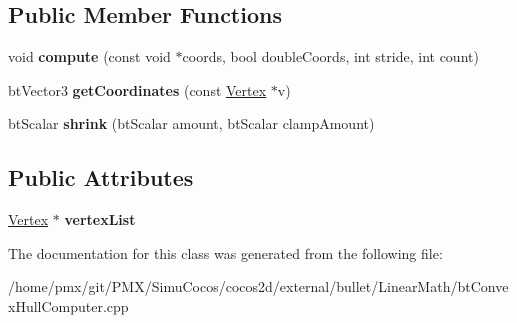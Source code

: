 \subsection*{Public Member Functions}
\begin{DoxyCompactItemize}
\item 
\mbox{\label{classbtConvexHullInternal_a3193acf9ab8a2416381c0606dda05ccb}} 
void {\bfseries compute} (const void $\ast$coords, bool double\+Coords, int stride, int count)
\item 
\mbox{\label{classbtConvexHullInternal_a431da4a67d7c6397a7430f0d0f32ba82}} 
bt\+Vector3 {\bfseries get\+Coordinates} (const \hyperlink{classbtConvexHullInternal_1_1Vertex}{Vertex} $\ast$v)
\item 
\mbox{\label{classbtConvexHullInternal_a4d735fa92e63b767062df799cb459b4b}} 
bt\+Scalar {\bfseries shrink} (bt\+Scalar amount, bt\+Scalar clamp\+Amount)
\end{DoxyCompactItemize}
\subsection*{Public Attributes}
\begin{DoxyCompactItemize}
\item 
\mbox{\label{classbtConvexHullInternal_a9383e066cfd29d6695f2ba95699846e4}} 
\hyperlink{classbtConvexHullInternal_1_1Vertex}{Vertex} $\ast$ {\bfseries vertex\+List}
\end{DoxyCompactItemize}


The documentation for this class was generated from the following file\+:\begin{DoxyCompactItemize}
\item 
/home/pmx/git/\+P\+M\+X/\+Simu\+Cocos/cocos2d/external/bullet/\+Linear\+Math/bt\+Convex\+Hull\+Computer.\+cpp\end{DoxyCompactItemize}
